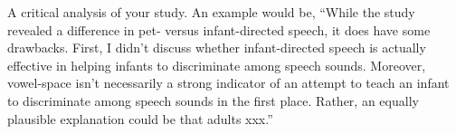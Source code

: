\documentclass[lab=1,title={Speaking rate},turnin=false]{com310lab}
\begin{document}
\begin{discussion}
	A critical analysis of your study.
	An example would be,
	``While the study revealed a difference in pet- versus infant-directed speech, it does have some drawbacks.
	First, I didn't discuss whether infant-directed speech is actually effective in helping infants to discriminate among speech sounds.
	Moreover, vowel-space isn’t necessarily a strong indicator of an attempt to teach an infant to discriminate among speech sounds in the first place. Rather, an equally plausible explanation could be that adults xxx.''
\end{discussion}
\end{document}
